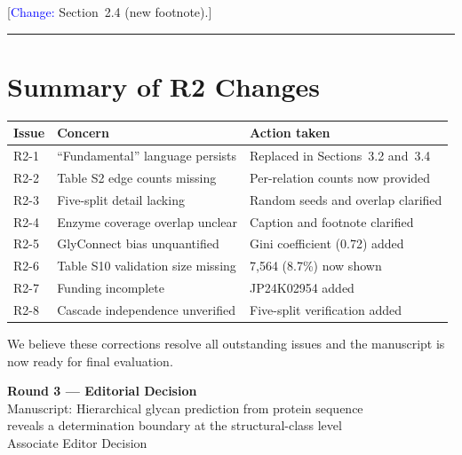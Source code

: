 \documentclass[11pt,a4paper]{article}
\newcommand{\change}[1]{[\textcolor{blue}{Change:} #1]}
\begin{document}
\change{Section~2.4 (new footnote).}

\vspace{1em}
\noindent\rule{\linewidth}{0.8pt}

\section*{Summary of R2 Changes}

\begin{center}
\small
\begin{tabular}{p{1.5cm}p{5cm}p{6cm}}
\hline
\textbf{Issue} & \textbf{Concern} & \textbf{Action taken} \\
\hline
R2-1 & ``Fundamental'' language persists & Replaced in Sections~3.2 and~3.4 \\
R2-2 & Table S2 edge counts missing & Per-relation counts now provided \\
R2-3 & Five-split detail lacking & Random seeds and overlap clarified \\
R2-4 & Enzyme coverage overlap unclear & Caption and footnote clarified \\
R2-5 & GlyConnect bias unquantified & Gini coefficient (0.72) added \\
R2-6 & Table S10 validation size missing & 7,564 (8.7\%) now shown \\
R2-7 & Funding incomplete & JP24K02954 added \\
R2-8 & Cascade independence unverified & Five-split verification added \\
\hline
\end{tabular}
\end{center}

\vspace{1em}

We believe these corrections resolve all outstanding issues and the manuscript
is now ready for final evaluation.

\newpage
\begin{center}
{\LARGE\bfseries Round 3 --- Editorial Decision}\\[0.8em]
{\large Manuscript: Hierarchical glycan prediction from protein sequence\\
reveals a determination boundary at the structural-class level}\\[0.5em]
{\normalsize Associate Editor Decision}
\end{center}
\end{document}
